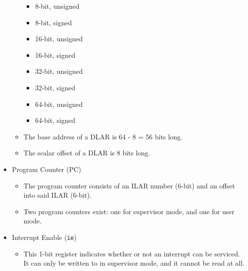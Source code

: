 \documentclass{article}
\begin{document}
\begin{itemize}
\begin{itemize}
\begin{itemize}
			\item 8-bit, unsigned
			\item 8-bit, signed
			\item 16-bit, unsigned
			\item 16-bit, signed
			\item 32-bit, unsigned
			\item 32-bit, signed
			\item 64-bit, unsigned
			\item 64-bit, signed
			\end{itemize}
		\item The base address of a DLAR is 64 - 8 = 56 bits long.
		\item The scalar offset of a DLAR is 8 bits long.
		\end{itemize}
	\item Program Counter (PC)
		\begin{itemize}
		\item The program counter consists of an ILAR number (6-bit) and an
			offset into said ILAR (6-bit).
		\item Two program counters exist:  one for supervisor mode, and one
			for user mode.
		\end{itemize}
	\item Interrupt Enable (\texttt{ie})
		\begin{itemize}
		\item This 1-bit register indicates whether or not an interrupt can
			be serviced.  It can only be written to in supervisor mode, and
			it cannot be read at all.
		\end{itemize}
	\end{itemize}

%
%
%
%
\end{document}
